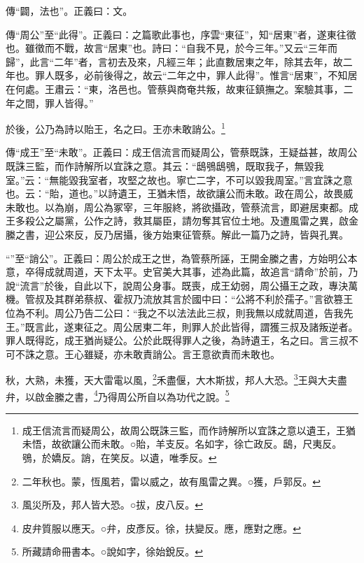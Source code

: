 {\noindent\zhuan{}\fzbyks 傳“闢，法也”。正義曰：文。 \par}

{\noindent\zhuan{}\fzbyks 傳“周公”至“此得”。正義曰：之篇歌此事也，序雲“東征”，知“居東”者，遂東往徵也。雖徵而不戰，故言“居東”也。詩曰：“自我不見，於今三年。”又云“三年而歸”，此言“二年”者，言初去及來，凡經三年；此直數居東之年，除其去年，故二年也。罪人既多，必前後得之，故云“二年之中，罪人此得”。惟言“居東”，不知居在何處。王肅云：“東，洛邑也。管蔡與商奄共叛，故東征鎮撫之。案驗其事，二年之間，罪人皆得。” \par}

於後，公乃為詩以貽王，名之曰。王亦未敢誚公。\footnote{成王信流言而疑周公，故周公既誅三監，而作詩解所以宜誅之意以遺王，王猶未悟，故欲讓公而未敢。○貽，羊支反。名如字，徐亡政反。鴟，尺夷反。鴞，於嬌反。誚，在笑反。以遺，唯季反。}

{\noindent\zhuan{}\fzbyks 傳“成王”至“未敢”。正義曰：成王信流言而疑周公，管蔡既誅，王疑益甚，故周公既誅三監，而作詩解所以宜誅之意。其云：“鴟鴞鴟鴞，既取我子，無毀我室。”云：“無能毀我室者，攻堅之故也。寧亡二字，不可以毀我周室。”言宜誅之意也。云：“貽，道也。”以詩遺王，王猶未悟，故欲讓公而未敢。政在周公，故畏威未敢也。以為崩，周公為冢宰，三年服終，將欲攝政，管蔡流言，即避居東都。成王多殺公之屬黨，公作之詩，救其屬臣，請勿奪其官位土地。及遭風雷之異，啟金縢之書，迎公來反，反乃居攝，後方始東征管蔡。解此一篇乃之詩，皆與孔異。 \par}

{\noindent\shu{}\fzkt “”至“誚公”。正義曰：周公於成王之世，為管蔡所誣，王開金縢之書，方始明公本意，卒得成就周道，天下太平。史官美大其事，述為此篇，故追言“請命”於前，乃說“流言”於後，自此以下，說周公身事。既喪，成王幼弱，周公攝王之政，專決萬機。管叔及其群弟蔡叔、霍叔乃流放其言於國中曰：“公將不利於孺子。”言欲篡王位為不利。周公乃告二公曰：“我之不以法法此三叔，則我無以成就周道，告我先王。”既言此，遂東征之。周公居東二年，則罪人於此皆得，謂獲三叔及諸叛逆者。罪人既得訖，成王猶尚疑公。公於此既得罪人之後，為詩遺王，名之曰。言三叔不可不誅之意。王心雖疑，亦未敢責誚公。言王意欲責而未敢也。 \par}

秋，大熟，未獲，天大雷電以風，\footnote{二年秋也。蒙，恆風若，雷以威之，故有風雷之異。○獲，戶郭反。}禾盡偃，大木斯拔，邦人大恐。\footnote{風災所及，邦人皆大恐。○拔，皮八反。}王與大夫盡弁，以啟金縢之書，\footnote{皮弁質服以應天。○弁，皮彥反。徐，扶變反。應，應對之應。}乃得周公所自以為功代之說。\footnote{所藏請命冊書本。○說如字，徐始銳反。}


